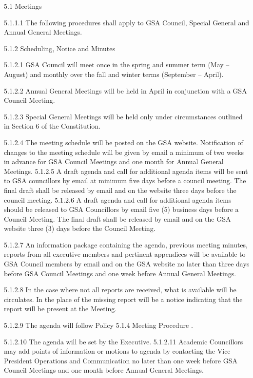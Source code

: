 ﻿5.1 Meetings 
 
 5.1.1.1 The following procedures shall apply to GSA Council, Special 
 General and Annual General Meetings. 
 
 
 5.1.2 Scheduling, Notice and Minutes 
 
 5.1.2.1 GSA Council will meet once in the spring and summer term (May – 
 August) and monthly over the fall and winter terms (September – 
 April). 
 
 5.1.2.2 Annual General Meetings will be held in April in conjunction with a 
 GSA Council Meeting. 
 
 5.1.2.3 Special General Meetings will be held only under circumstances 
 outlined in Section 6 of the Constitution. 
 
 5.1.2.4 The meeting schedule will be posted on the GSA website. 
 Notification of changes to the meeting schedule will be given by 
 email a minimum of two weeks in advance for GSA Council 
 Meetings and one month for Annual General Meetings. 
 5.1.2.5 A draft agenda and call for additional agenda items will be sent to 
 GSA councillors by email at minimum five days before a council 
 meeting. The final draft shall be released by email and on the 
 website three days before the council meeting. 
 5.1.2.6 A draft agenda and call for additional agenda items should be 
 released to GSA Councillors by email five (5) business days before 
 a Council Meeting. The final draft shall be released by email and on 
 the GSA website three (3) days before the Council Meeting. 
 
 5.1.2.7 An information package containing the agenda, previous meeting 
 minutes, reports from all executive members and pertinent 
 appendices will be available to GSA Council members by email and 
 on the GSA website no later than three days before GSA Council 
 Meetings and one week before Annual General Meetings. 
 
 5.1.2.8 In the case where not all reports are received, what is available will be circulates. In the place of the missing report will be a notice 
 indicating that the report will be present at the Meeting. 
 
 5.1.2.9 The agenda will follow Policy 5.1.4 Meeting Procedure . 
 
 5.1.2.10 The agenda will be set by the Executive. 
 5.1.2.11 Academic Councillors may add points of information or motions to 
 agenda by contacting the Vice President Operations and 
 Communication no later than one week before GSA Council 
 Meetings and one month before Annual General Meetings. 
 
